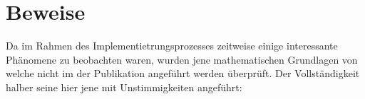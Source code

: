 \chapter{Beweise}
\label{ch:beweise}

Da im Rahmen des Implementietrungsprozesses zeitweise einige interessante Ph\"anomene zu beobachten waren, wurden jene mathematischen Grundlagen von \cite{xiang2007robust} welche nicht im der Publikation angef\"uhrt werden \"uberpr\"uft. Der Vollst\"andigkeit halber seine hier jene mit Unstimmigkeiten angef\"uhrt:









